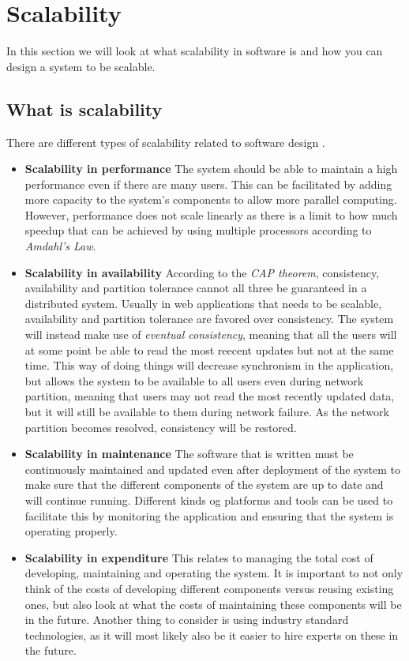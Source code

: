\section{Scalability}
In this section we will look at what scalability in software is and how you can design a system to be scalable. 

\subsection{What is scalability}
There are different types of scalability related to software design \cite{ScalabilityDesignPrinciples}.
\begin{itemize}
    \item \textbf{Scalability in performance} The system should be able to maintain a high performance even if there are many users. This can be facilitated by adding more capacity to the system's components to allow more parallel computing. 
    However, performance does not scale linearly as there is a limit to how much speedup that can be achieved by using multiple processors according to \textit{Amdahl's Law}. 
    \item \textbf{Scalability in availability} According to the \textit{CAP theorem}, consistency, availability and partition tolerance cannot all three be guaranteed in a distributed system. 
    Usually in web applications that needs to be scalable, availability and partition tolerance are favored over consistency. 
    The system will instead make use of \textit{eventual consistency}, meaning that all the users will at some point be able to read the most reecent updates but not at the same time. 
    This way of doing things will decrease synchronism in the application, but allows the system to be available to all users even during network partition, meaning that users may not read the most recently updated data, but it will still be available to them during network failure. As the network partition becomes resolved, consistency will be restored.
    \item \textbf{Scalability in maintenance} The software that is written must be continuously maintained and updated even after deployment of the system to make sure that the different components of the system are up to date and will continue running. 
    Different kinds og platforms and tools can be used to facilitate this by monitoring the application and ensuring that the system is operating properly. 
    \item \textbf{Scalability in expenditure} This relates to managing the total cost of developing, maintaining and operating the system. 
    It is important to not only think of the costs of developing different components versus reusing existing ones, but also look at what the costs of maintaining these components will be in the future. 
    Another thing to consider is using industry standard technologies, as it will most likely also be it easier to hire experts on these in the future.
\end{itemize}

